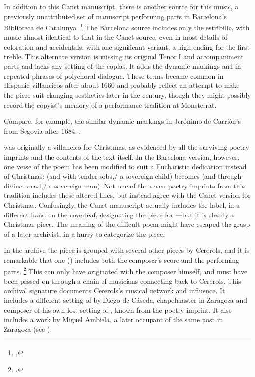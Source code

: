 In addition to this Canet manuscript, there is another source for this music, a
previously unattributed set of manuscript performing parts in Barcelona's
Biblioteca de Catalunya.%
    \footnote{.}
The Barcelona source includes only the estribillo, with music almost identical
to that in the Canet source, even in most details of coloration and accidentals,
with one significant variant, a  high ending for the first treble.
This alternate version is missing its original Tenor I and accompaniment parts
and lacks any setting of the coplas.
It adds the dynamic markings  and  in repeated phrases
of polychoral dialogue. 
These terms became common in Hispanic villancicos after about 1660 and probably
reflect an attempt to make the piece suit changing aesthetics later in the
century, though they might possibly record the copyist's memory of a performance
tradition at Monsterrat.%
\begin{Footnote}
    Compare, for example, the similar dynamic markings in Jerónimo de Carrión's
     from Segovia after 1684: 
    \autocite[331--336]{Cashner:PhD}.
\end{Footnote}


 was originally a villancico for Christmas, as
evidenced by all the surviving poetry imprints and the contents of the text
itself.
In the Barcelona version, however, one verse of the poem has been modified to
suit a Eucharistic dedication instead of Christmas:  (and with tender sobs,/ a sovereign child) becomes
 (and through divine bread,/
a sovereign man).
Not one of the seven poetry imprints from this tradition includes these altered
lines, but instead agree with the Canet version for Christmas.
Confusingly, the Canet manuscript actually includes the label, in a different
hand on the coverleaf, designating the piece for ---but it is clearly a Christmas piece.
The meaning of the difficult poem might have escaped the grasp of a later
archivist, in a hurry to categorize the piece.


In the archive the piece is grouped with several other pieces by Cererols, and
it is remarkable that one () includes both
the composer's score and the performing parts.%
    \footnote{.}
This can only have originated with the composer himself, and must have been
passed on through a chain of musicians connecting back to Cererols.
This archival signature documents Cererols's musical network and influence.
It includes a different setting of  by Diego
de Cáseda, chapelmaster in Zaragoza and composer of his own lost setting of
, known from the poetry imprint.
It also includes a work by Miguel Ambiela, a later occupant of the same post in
Zaragoza (see ).

